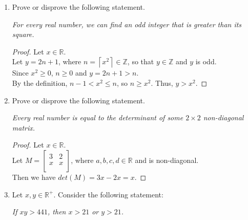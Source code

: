 \documentclass[12pt]{amsart}
\newcommand{\ceil}[1]{\ensuremath{\left\lceil #1\right\rceil}}
\begin{document}
\begin{enumerate}[{\bfseries 1.}]
\newpage
\item Prove or disprove the following statement.

	\vspace{0.1in}
	\begin{center}
	\noindent
	\textit{For every real number, we can find an odd integer that is greater than its square.}
	\end{center}
	\begin{normalize}
	    \begin{proof}
	    \vspace{0.1in}
	    Let $x\in\mathbb{R}$.
	    \\Let $y = 2n +1$, where $n = \ceil{x^2} \in\mathbb{Z}$, so that $y\in\mathbb{Z}$ and $y$ is odd. 
	    \\Since $x^2\geq 0$, $n\geq 0$ and $y = 2n+1 > n$. 
	    \\By the definition, $n-1<x^2\leq n$, so $n\geq x^2$. Thus, $y > x^2$.
	    \end{proof}
	\end{normalize}

\vspace{0.2in}
\item Prove or disprove the following statement.

	\vspace{0.1in}
	\begin{center}
	\noindent
	\textit{Every real number is equal to the determinant of some $2\times 2$ non-diagonal matrix.}
	\end{center}
	\begin{normalize}
	    \begin{proof}
	    \vspace{0.1in}
	    Let $x\in\mathbb{R}$.
	    \\Let $M = {\begin{bmatrix}
	    3 & 2 \\
	    x & x \\
	    \end{bmatrix}}$, where $a, b, c, d\in\mathbb{R}$ and is non-diagonal.
	    \\Then we have $det(M) = 3x - 2x = x$. 
	    \end{proof}
	\end{normalize}

\newpage
\item Let $x, y\in\mathbb{R}^{+}$.  Consider the following statement:

	\vspace{0.1in}
	\begin{center}
	\noindent
	\textit{If $xy>441$, then $x>21$ or $y>21$.}
	\end{center}


\end{enumerate}
\end{document}
